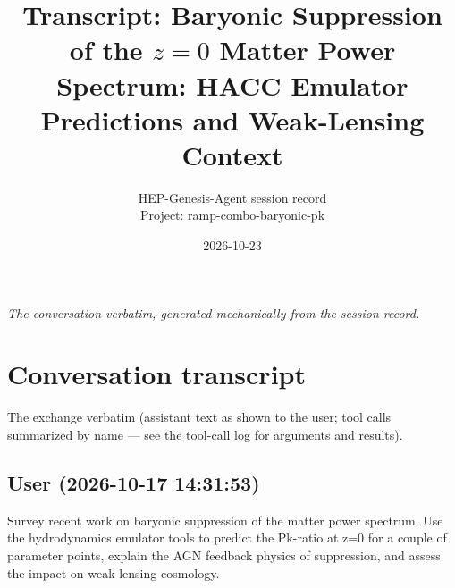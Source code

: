 \documentclass[11pt,a4paper]{article}
\title{Transcript: Baryonic Suppression of the $z=0$ Matter Power Spectrum: HACC Emulator Predictions and Weak-Lensing Context}
\author{HEP-Genesis-Agent session record \\ \small Project: ramp-combo-baryonic-pk}
\date{2026-10-23}
\begin{document}
\maketitle
\noindent\textit{\small The conversation verbatim, generated mechanically from the session record.}
\vspace{1em}



\appendix
\section{Conversation transcript}
\label{app:transcript}
The exchange verbatim (assistant text as shown to the user; tool calls summarized by name --- see the tool-call log for arguments and results).
\subsection*{User \small(2026-10-17 14:31:53)}
Survey recent work on baryonic suppression of the matter power spectrum. Use the hydrodynamics emulator tools to predict the Pk-ratio at z=0 for a couple of parameter points, explain the AGN feedback physics of suppression, and assess the impact on weak-lensing cosmology.
\end{document}

